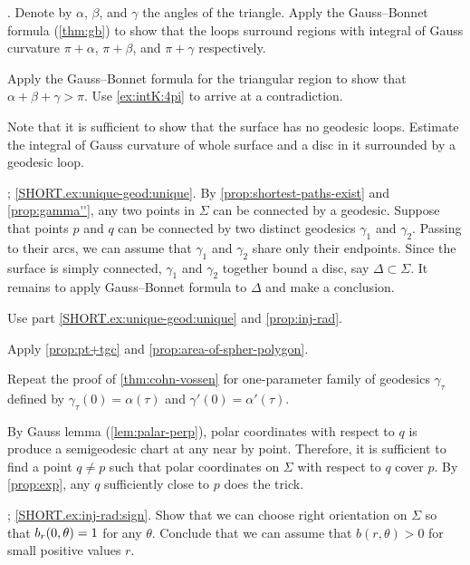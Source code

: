 .
Denote by $\alpha$, $\beta$, and $\gamma$ the angles of the triangle.
Apply the Gauss--Bonnet formula (\ref{thm:gb}) to show that the loops surround regions with integral of Gauss curvature $\pi+\alpha$, $\pi+\beta$, and $\pi+\gamma$ respectively.

Apply the Gauss--Bonnet formula for the triangular region to show that $\alpha+\beta+\gamma>\pi$.
Use \ref{ex:intK:4pi} to arrive at a contradiction.

 Note that it is sufficient to show that the surface has no geodesic loops.
Estimate the integral of Gauss curvature of whole surface and a disc in it surrounded by a geodesic loop.

\parbf{\ref{ex:unique-geod}}; \ref{SHORT.ex:unique-geod:unique}.
By \ref{prop:shortest-paths-exist} and \ref{prop:gamma''}, any two points in $\Sigma$ can be connected by a geodesic.
Suppose that points $p$ and $q$ can be connected by two distinct geodesics $\gamma_1$ and $\gamma_2$.
Passing to their arcs, we can assume that $\gamma_1$ and $\gamma_2$ share only their endpoints.
Since the surface is simply connected, $\gamma_1$ and $\gamma_2$ together bound a disc, say $\Delta\subset\Sigma$.
It remains to apply Gauss--Bonnet formula to $\Delta$ and make a conclusion.
 
Use part \ref{SHORT.ex:unique-geod:unique} and \ref{prop:inj-rad}.

Apply \ref{prop:pt+tgc} and \ref{prop:area-of-spher-polygon}.

 Repeat the proof of \ref{thm:cohn-vossen} for one-parameter family of geodesics $\gamma_\tau$ defined by $\gamma_\tau(0)=\alpha(\tau)$ and $\gamma'(0)=\alpha'(\tau)$. 

\setcounter{eqtn}{0}

By Gauss lemma (\ref{lem:palar-perp}), polar coordinates with respect to $q$ is produce a semigeodesic chart at any near by point.
Therefore, it is sufficient to find a point $q\ne p$ such that polar coordinates on $\Sigma$ with respect to $q$ cover $p$.
By \ref{prop:exp}, any $q$ sufficiently close to $p$ does the trick.

\parbf{\ref{ex:inj-rad}}; \ref{SHORT.ex:inj-rad:sign}.
Show that we can choose right orientation on $\Sigma$ so that $b_r(0,\theta)\z=1$ for any $\theta$.
Conclude that we can assume that $b(r,\theta)>0$ for small positive values $r$.

